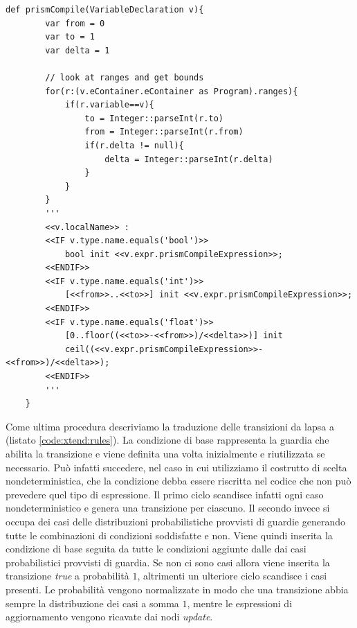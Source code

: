 \begin{lstlisting}[language=xtend,style=eclipse,caption={Traduzione della dichiarazione di variabili da \ac{lapsa} a \prism{}},label=code:xtend:vars]
	def prismCompile(VariableDeclaration v){
		var from = 0
		var to = 1
		var delta = 1

		// look at ranges and get bounds
		for(r:(v.eContainer.eContainer as Program).ranges){
			if(r.variable==v){
				to = Integer::parseInt(r.to)
				from = Integer::parseInt(r.from)
				if(r.delta != null){
					delta = Integer::parseInt(r.delta)
				}
			}
		}
		'''
		<<v.localName>> : 
		<<IF v.type.name.equals('bool')>>
			bool init <<v.expr.prismCompileExpression>>;
		<<ENDIF>>
		<<IF v.type.name.equals('int')>>
			[<<from>>..<<to>>] init <<v.expr.prismCompileExpression>>;
		<<ENDIF>>
		<<IF v.type.name.equals('float')>>
			[0..floor((<<to>>-<<from>>)/<<delta>>)] init
			ceil((<<v.expr.prismCompileExpression>>-<<from>>)/<<delta>>);
		<<ENDIF>>
		'''
	}
\end{lstlisting}

Come ultima procedura descriviamo la traduzione delle transizioni da \ac{lapsa} a \prism{} (listato \ref{code:xtend:rules}). La condizione di base rappresenta la guardia che abilita la transizione e viene definita una volta inizialmente e riutilizzata se necessario. Può infatti succedere, nel caso in cui utilizziamo il costrutto di scelta nondeterministica, che la condizione debba essere riscritta nel codice \prism{} che non può prevedere quel tipo di espressione. Il primo ciclo scandisce infatti ogni caso nondeterministico e genera una transizione per ciascuno. Il secondo invece si occupa dei casi delle distribuzioni probabilistiche provvisti di guardie generando tutte le combinazioni di condizioni soddisfatte e non. Viene quindi inserita la condizione di base seguita da tutte le condizioni aggiunte dalle dai casi probabilistici provvisti di guardia. Se non ci sono casi allora viene inserita la transizione \emph{true} a probabilità $1$, altrimenti un ulteriore ciclo scandisce i casi presenti. Le probabilità vengono normalizzate in modo che una transizione abbia sempre la distribuzione dei casi a somma $1$, mentre le espressioni di aggiornamento vengono ricavate dai nodi \emph{update}.


